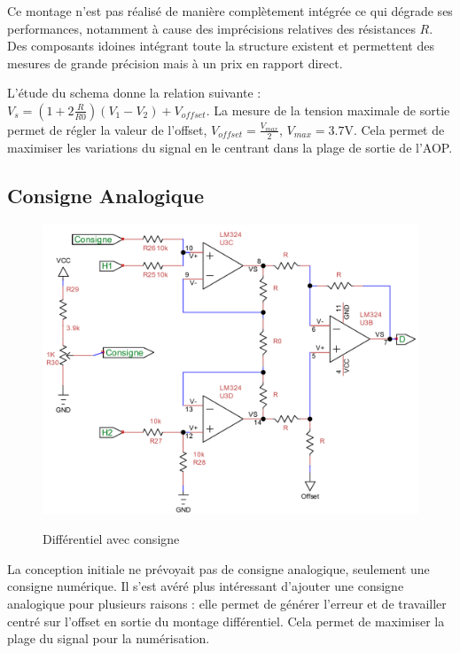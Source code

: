 \documentclass[11pt, french]{article} %
\begin{document}
Ce montage n'est pas réalisé de manière complètement intégrée ce qui dégrade ses performances, notamment à cause des imprécisions relatives des résistances $R$. Des composants idoines intégrant toute la structure existent et permettent des mesures de grande précision mais à un prix en rapport direct.

L'étude du schema donne la relation suivante : $V_s=(1+2 \frac{R}{R0})(V_1-V_2) + V_{offset}$. La mesure de la tension maximale de sortie permet de régler la valeur de l'offset, $V_{offset}=\frac{V_{max}}{2}$, $V_{max}=3.7$V. Cela permet de maximiser les variations du signal en le centrant dans la plage de sortie de l'AOP.

\subsection{Consigne Analogique}
\begin{figure}
  \includegraphics[width=\linewidth]{SolutionAnalogique/AmpInstCons.pdf}
  \label{DiffConsigne}  
  \caption{Différentiel avec consigne}
\end{figure}
La conception initiale ne prévoyait pas de consigne analogique, seulement une consigne numérique. Il s'est avéré plus intéressant d'ajouter une consigne analogique pour plusieurs raisons : elle permet de générer l'erreur et de travailler centré sur l'offset en sortie du montage différentiel. Cela permet de maximiser la plage du signal pour la numérisation.
\end{document}
